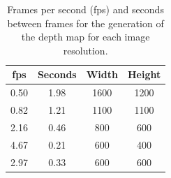 \documentclass[10pt,a4paper,twocolumn,twoside]{article}
\begin{document}
	\begin{table}
		\begin{center}
			\begin{tabular}{cccc}
				\toprule
				fps & Seconds & Width & Height \\ 
				\midrule
				0.50 & 1.98 & 1600 & 1200 \\ 
				
				0.82 & 1.21 & 1100 & 1100 \\ 
				
				2.16 & 0.46 & 800 & 600 \\ 
				
				4.67 & 0.21 & 600 & 400 \\ 
				
				2.97 & 0.33 & 600 & 600 \\ 
				\bottomrule
				
			\end{tabular} 
			\caption{Frames per second (fps) and seconds between frames for the generation of the depth map for each image resolution.}
			\label{tab:depthmap}
		\end{center}
	\end{table}
\end{document}

